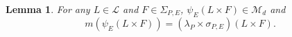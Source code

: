 \documentclass[11pt]{article}
\newtheorem{lemma}[theorem]{Lemma}
\theoremstyle{remark}
\newtheorem{remark}{Remark}
\begin{document}

\begin{lemma}\label{lem:AllMeasurableRectangles} For any $L\in\mathcal{L}$ and $F\in \Sigma_{P,E}$, $\psi_E(L\times F)\in\mathcal{M}_d$ and 
\begin{equation*}
m(\psi_E(L\times F))=(\lambda_P\times\sigma_{P,E})(L\times F).
\end{equation*}
\end{lemma}
\end{document}
